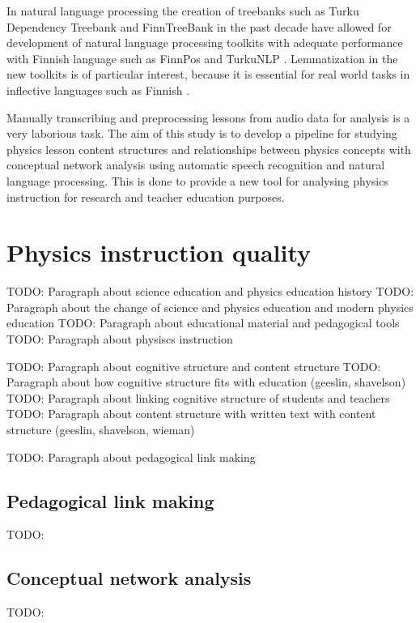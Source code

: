 \documentclass[utf8,english]{gradu3}
\begin{document}
In natural language processing the creation of treebanks such as Turku Dependency Treebank and FinnTreeBank in the past decade have allowed for development of natural language processing toolkits with adequate performance with Finnish language such as FinnPos \parencite{silfverberg2016finnpos} and TurkuNLP \parencite{kanerva2018turku}. Lemmatization in the new toolkits is of particular interest, because it is essential for real world tasks in inflective languages such as Finnish \parencite{kanerva2018turku}.

Manually transcribing and preprocessing lessons from audio data for analysis is a very laborious task. The aim of this study is to develop a pipeline for studying physics lesson content structures and relationships between physics concepts with conceptual network analysis using automatic speech recognition and natural language processing. This is done to provide a new tool for analysing physics instruction for research and teacher education purposes. 

\chapter{Physics instruction quality}
TODO: Paragraph about science education and physics education history
TODO: Paragraph about the change of science and physics education and modern physics education
TODO: Paragraph about educational material and pedagogical tools
TODO: Paragraph about physiscs instruction

TODO: Paragraph about cognitive structure and content structure
TODO: Paragraph about how cognitive structure fits with education (geeslin, shavelson)
TODO: Paragraph about linking cognitive structure of students and teachers
TODO: Paragraph about content structure with written text with content structure (geeslin, shavelson, wieman)

TODO: Paragraph about pedagogical link making

\section{Pedagogical link making}
TODO: \parencite{scott2011pedagogical}

\section{Conceptual network analysis}
TODO: \parencite{mclinden2013concept,fischer2014quality, vargas}
\end{document}
